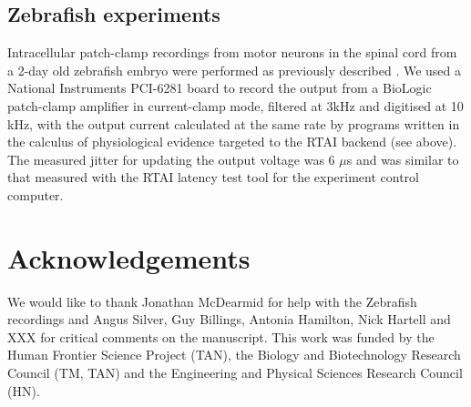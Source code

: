 \subsection*{Zebrafish experiments}

Intracellular patch-clamp recordings from motor neurons in the spinal
cord from a 2-day old zebrafish embryo were performed as previously
described \citep{McDearmid2006}. We used a National Instruments PCI-6281 board to
record the output from a BioLogic patch-clamp amplifier in
current-clamp mode, filtered at 3kHz and digitised at 10 kHz, with the
output current calculated at the same rate by programs written in the
calculus of physiological evidence targeted to the RTAI backend (see
above). The measured jitter for updating the output voltage was 6
$\mu$s and was similar to that measured with the RTAI latency test
tool for the experiment control computer.

\section*{Acknowledgements}
We would like to thank Jonathan McDearmid for help with the Zebrafish
recordings and Angus Silver, Guy Billings, Antonia Hamilton, Nick Hartell
and XXX for critical comments on the manuscript. This work was funded
by the Human Frontier Science Project (TAN), the Biology and Biotechnology
Research Council (TM, TAN) and the Engineering and Physical Sciences Research
Council (HN).




